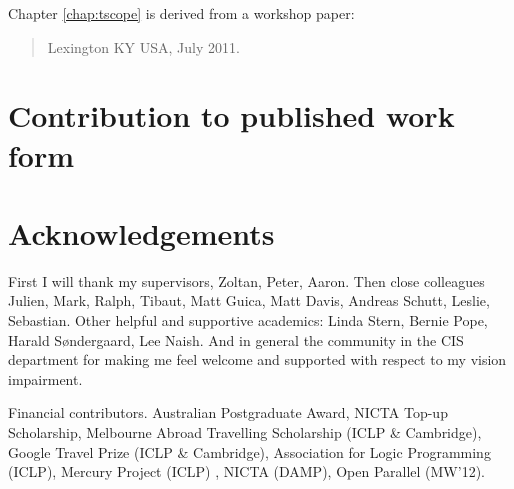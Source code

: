 \documentclass[a4paper,twoside]{report}
\begin{document}
\begin{quote}
\end{quote}


Chapter \ref{chap:tscope} is derived from a workshop paper:

\begin{quote}
{Lexington KY USA, July 2011.}
\end{quote}


\chapter*{Contribution to published work form}


\chapter*{Acknowledgements}


First I will thank my supervisors,
Zoltan,
Peter,
Aaron.
Then close colleagues
Julien, 
Mark, 
Ralph, 
Tibaut,
Matt Guica,
Matt Davis,
Andreas Schutt,
Leslie,
Sebastian.
Other helpful and supportive academics:
Linda Stern,
Bernie Pope,
Harald S{\o}ndergaard,
Lee Naish.
And in general the community in the CIS department for making me feel
welcome and supported with respect to my vision impairment.

Financial contributors.
Australian Postgraduate Award,
NICTA Top-up Scholarship,
Melbourne Abroad Travelling Scholarship (ICLP \& Cambridge),
Google Travel Prize (ICLP \& Cambridge),
Association for Logic Programming (ICLP),
Mercury Project (ICLP) ,
NICTA (DAMP),
Open Parallel (MW'12).
\end{document}
